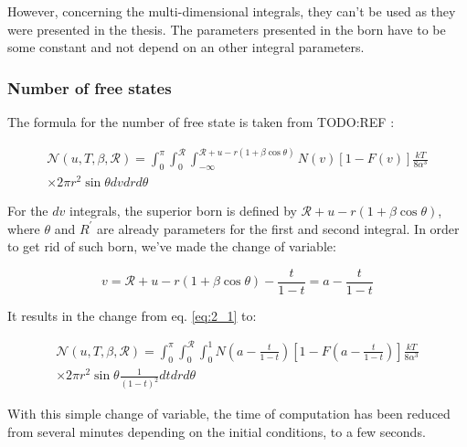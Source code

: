 However, concerning the multi-dimensional integrals, they can't be used as they were presented in the thesis. The parameters presented in the born have to be some constant and not depend on an other integral parameters.

\subsubsection{Number of free states\label{sec:free_states}}

The formula for the number of free state is taken from TODO:REF :

\begin{equation}
    \begin{aligned}
    \mathcal{N}\left(u, T, \beta, \mathscr{R}\right)=\int_{0}^{\pi} \int_{0}^{\mathscr{R}} \int_{-\infty}^{\mathscr{R}+u-r(1+\beta \cos \theta)} N\left(v\right)\left[1-F\left(v\right)\right] \frac{k T}{8 \alpha^{3}} \\
    \times 2 \pi r^2 \sin \theta d v d r d \theta
    \end{aligned}
    \label{eq:2_1}
\end{equation}

For the $d v$ integrals, the superior born is defined by $\mathscr{R}+u-r(1+\beta \cos \theta)$, where $\theta$ and $R^\prime$ are already parameters for the first and second integral. In order to get rid of such born, we've made the change of variable:

\begin{equation}
    v = \mathscr{R}+u-r(1+\beta \cos \theta) - \frac{t}{1 - t} = a - \frac{t}{1-t}
    \label{eq:2_2}
\end{equation}

It results in the change from eq. \ref{eq:2_1} to:

\begin{equation}
    \begin{aligned}
    \mathcal{N}\left(u, T, \beta, \mathscr{R}\right)=\int_{0}^{\pi} \int_{0}^{\mathscr{R}} \int_{0}^{1} N\left(a - \frac{t}{1-t}\right)\left[1-F\left(a - \frac{t}{1-t}\right)\right] \frac{k T}{8 \alpha^{3}} \\
    \times 2 \pi r^2 \sin \theta \frac{1}{(1 - t)^2} d t d r d \theta
    \end{aligned}
    \label{eq:2_3}
\end{equation}

With this simple change of variable, the time of computation has been reduced from several minutes depending on the initial conditions, to a few seconds.

